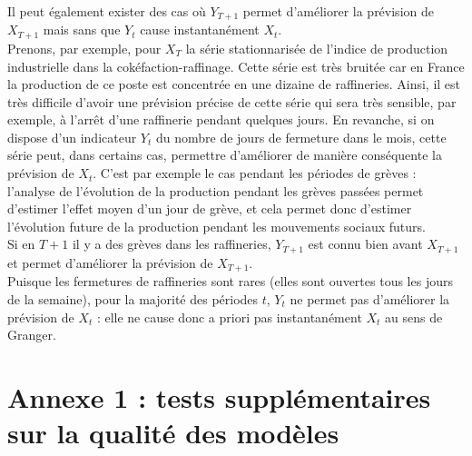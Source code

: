 \documentclass[,french]{article}
\begin{document}
Il peut également exister des cas où \(Y_{T+1}\) permet d'améliorer la prévision de \(X_{T+1}\) mais sans que \(Y_t\) cause instantanément \(X_t\).\\
Prenons, par exemple, pour \(X_T\) la série stationnarisée de l'indice de production industrielle dans la cokéfaction-raffinage.
Cette série est très bruitée car en France la production de ce poste est concentrée en une dizaine de raffineries.
Ainsi, il est très difficile d'avoir une prévision précise de cette série qui sera très sensible, par exemple, à l'arrêt d'une raffinerie pendant quelques jours.
En revanche, si on dispose d'un indicateur \(Y_t\) du nombre de jours de fermeture dans le mois, cette série peut, dans certains cas, permettre d'améliorer de manière conséquente la prévision de \(X_t\).
C'est par exemple le cas pendant les périodes de grèves : l'analyse de l'évolution de la production pendant les grèves passées permet d'estimer l'effet moyen d'un jour de grève, et cela permet donc d'estimer l'évolution future de la production pendant les mouvements sociaux futurs.\\
Si en \(T+1\) il y a des grèves dans les raffineries, \(Y_{T+1}\) est connu bien avant \(X_{T+1}\) et permet d'améliorer la prévision de \(X_{T+1}\).\\
Puisque les fermetures de raffineries sont rares (elles sont ouvertes tous les jours de la semaine), pour la majorité des périodes \(t\), \(Y_t\) ne permet pas d'améliorer la prévision de \(X_t\) : elle ne cause donc a priori pas instantanément \(X_t\) au sens de Granger.

\newpage

\hypertarget{appendix-appendix}{%
\appendix}


\setcounter{page}{0}

\hypertarget{sec:qualRes}{%
\section{Annexe 1 : tests supplémentaires sur la qualité des modèles}\label{sec:qualRes}}
\end{document}
